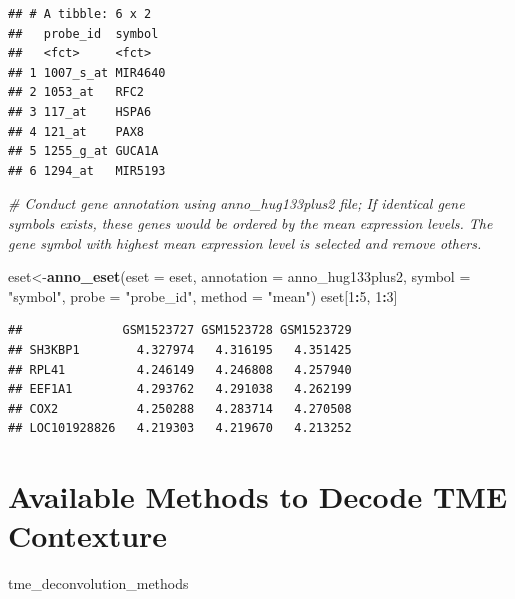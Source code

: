 \documentclass[
  12pt,
]{book}
\newenvironment{Shaded}{\begin{snugshade}}{\end{snugshade}}
\newcommand{\AttributeTok}[1]{\textcolor[rgb]{0.13,0.29,0.53}{#1}}
\newcommand{\CommentTok}[1]{\textcolor[rgb]{0.56,0.35,0.01}{\textit{#1}}}
\newcommand{\DecValTok}[1]{\textcolor[rgb]{0.00,0.00,0.81}{#1}}
\newcommand{\FunctionTok}[1]{\textcolor[rgb]{0.13,0.29,0.53}{\textbf{#1}}}
\newcommand{\NormalTok}[1]{#1}
\newcommand{\OtherTok}[1]{\textcolor[rgb]{0.56,0.35,0.01}{#1}}
\newcommand{\SpecialCharTok}[1]{\textcolor[rgb]{0.81,0.36,0.00}{\textbf{#1}}}
\newcommand{\StringTok}[1]{\textcolor[rgb]{0.31,0.60,0.02}{#1}}
\begin{document}
\begin{verbatim}
## # A tibble: 6 x 2
##   probe_id  symbol 
##   <fct>     <fct>  
## 1 1007_s_at MIR4640
## 2 1053_at   RFC2   
## 3 117_at    HSPA6  
## 4 121_at    PAX8   
## 5 1255_g_at GUCA1A 
## 6 1294_at   MIR5193
\end{verbatim}

\begin{Shaded}
\begin{Highlighting}[]
\CommentTok{\# Conduct gene annotation using \textasciigrave{}anno\_hug133plus2\textasciigrave{} file; If identical gene symbols exists, these genes would be ordered by the mean expression levels. The gene symbol with highest mean expression level is selected and remove others. }

\NormalTok{eset}\OtherTok{\textless{}{-}}\FunctionTok{anno\_eset}\NormalTok{(}\AttributeTok{eset       =}\NormalTok{ eset,}
                \AttributeTok{annotation =}\NormalTok{ anno\_hug133plus2,}
                \AttributeTok{symbol     =} \StringTok{"symbol"}\NormalTok{,}
                \AttributeTok{probe      =} \StringTok{"probe\_id"}\NormalTok{,}
                \AttributeTok{method     =} \StringTok{"mean"}\NormalTok{)}
\NormalTok{eset[}\DecValTok{1}\SpecialCharTok{:}\DecValTok{5}\NormalTok{, }\DecValTok{1}\SpecialCharTok{:}\DecValTok{3}\NormalTok{]}
\end{Highlighting}
\end{Shaded}

\begin{verbatim}
##              GSM1523727 GSM1523728 GSM1523729
## SH3KBP1        4.327974   4.316195   4.351425
## RPL41          4.246149   4.246808   4.257940
## EEF1A1         4.293762   4.291038   4.262199
## COX2           4.250288   4.283714   4.270508
## LOC101928826   4.219303   4.219670   4.213252
\end{verbatim}

\hypertarget{available-methods-to-decode-tme-contexture}{%
\section{Available Methods to Decode TME Contexture}\label{available-methods-to-decode-tme-contexture}}

\begin{Shaded}
\begin{Highlighting}[]
\NormalTok{tme\_deconvolution\_methods}
\end{Highlighting}
\end{Shaded}
\end{document}

